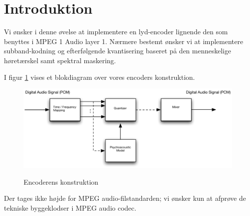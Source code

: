 \section{Introduktion}
Vi ønsker i denne øvelse at implementere en lyd-encoder lignende den som benyttes i MPEG 1 Audio layer 1. Nærmere bestemt ønsker vi at implementere subband-kodning og efterfølgende kvantisering baseret på den menneskelige høretærskel samt spektral maskering.

I figur \ref{blokdiagram} vises et blokdiagram over vores encoders konstruktion.

\begin{figure}[h!]
\begin{center}
\includegraphics[width=12cm]{blokdiagram}\\
\end{center}
\label{blokdiagram}
\caption{Encoderens konstruktion}
\end{figure}

Der tages ikke højde for MPEG audio-filstandarden; vi ønsker kun at afprøve de tekniske byggeklodser i MPEG audio codec.
